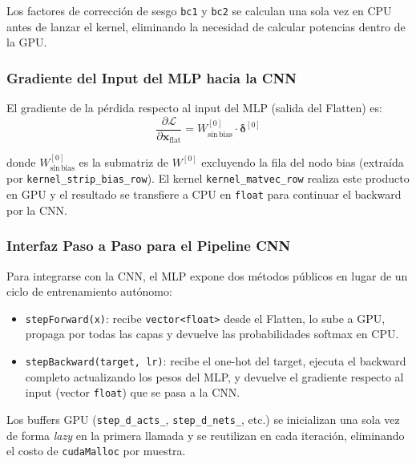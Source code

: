 \documentclass[12pt,a4paper]{article}
\begin{document}
Los factores de corrección de sesgo \texttt{bc1} y \texttt{bc2} se calculan una sola
vez en CPU antes de lanzar el kernel, eliminando la necesidad de calcular potencias
dentro de la GPU.

\subsubsection{Gradiente del Input del MLP hacia la CNN}

El gradiente de la pérdida respecto al input del MLP (salida del Flatten) es:
\begin{equation}
  \frac{\partial \mathcal{L}}{\partial \mathbf{x}_{\mathrm{flat}}}
  = W^{[0]}_{\mathrm{sin\,bias}} \cdot \boldsymbol{\delta}^{[0]}
  \label{eq:grad_input_mlp}
\end{equation}

donde $W^{[0]}_{\mathrm{sin\,bias}}$ es la submatriz de $W^{[0]}$ excluyendo la fila
del nodo bias (extraída por \texttt{kernel\_strip\_bias\_row}). El kernel
\texttt{kernel\_matvec\_row} realiza este producto en GPU y el resultado se transfiere
a CPU en \texttt{float} para continuar el backward por la CNN.

\subsubsection{Interfaz Paso a Paso para el Pipeline CNN}

Para integrarse con la CNN, el MLP expone dos métodos públicos en lugar de un ciclo
de entrenamiento autónomo:

\begin{itemize}
  \item \texttt{stepForward(x)}: recibe \texttt{vector<float>} desde el Flatten, lo
    sube a GPU, propaga por todas las capas y devuelve las probabilidades softmax en
    CPU.
  \item \texttt{stepBackward(target, lr)}: recibe el one-hot del target,
    ejecuta el backward completo actualizando los pesos del MLP, y devuelve el
    gradiente respecto al input (vector \texttt{float}) que se pasa a la CNN.
\end{itemize}

Los buffers GPU (\texttt{step\_d\_acts\_}, \texttt{step\_d\_nets\_}, etc.) se
inicializan una sola vez de forma \textit{lazy} en la primera llamada y se reutilizan
en cada iteración, eliminando el costo de \texttt{cudaMalloc} por muestra.

\end{document}
